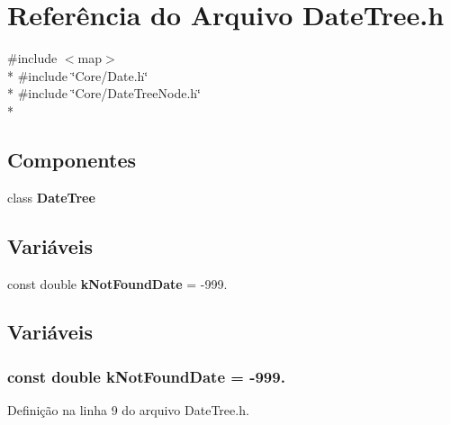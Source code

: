 \section{Referência do Arquivo Date\+Tree.\+h}
\label{_date_tree_8h}
{\ttfamily \#include $<$map$>$}\\*
{\ttfamily \#include \char`\"{}Core/\+Date.\+h\char`\"{}}\\*
{\ttfamily \#include \char`\"{}Core/\+Date\+Tree\+Node.\+h\char`\"{}}\\*
\subsection*{Componentes}
\begin{DoxyCompactItemize}
\item 
class {\bf Date\+Tree}
\end{DoxyCompactItemize}
\subsection*{Variáveis}
\begin{DoxyCompactItemize}
\item 
const double {\bf k\+Not\+Found\+Date} = -\/999.
\end{DoxyCompactItemize}


\subsection{Variáveis}
\subsubsection[{k\+Not\+Found\+Date}]{\setlength{\rightskip}{0pt plus 5cm}const double k\+Not\+Found\+Date = -\/999.}\label{_date_tree_8h_a20f69b663a484d7fb963af444112c012}


Definição na linha 9 do arquivo Date\+Tree.\+h.


